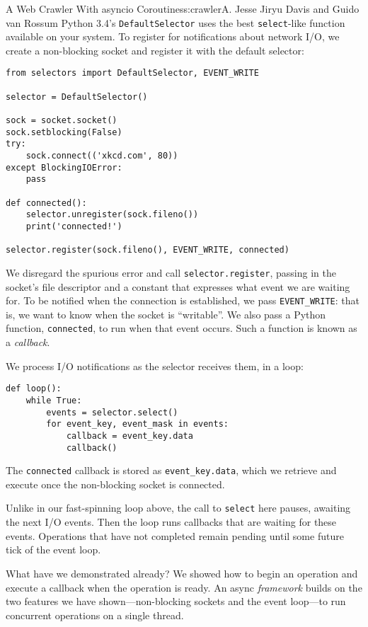 \begin{aosachapter}{A Web Crawler With asyncio Coroutines}{s:crawler}{A. Jesse Jiryu Davis and Guido van Rossum}
Python 3.4's \texttt{DefaultSelector} uses the best \texttt{select}-like
function available on your system. To register for notifications about
network I/O, we create a non-blocking socket and register it with the
default selector:

\begin{verbatim}
from selectors import DefaultSelector, EVENT_WRITE

selector = DefaultSelector()

sock = socket.socket()
sock.setblocking(False)
try:
    sock.connect(('xkcd.com', 80))
except BlockingIOError:
    pass

def connected():
    selector.unregister(sock.fileno())
    print('connected!')

selector.register(sock.fileno(), EVENT_WRITE, connected)
\end{verbatim}

We disregard the spurious error and call \texttt{selector.register},
passing in the socket's file descriptor and a constant that expresses
what event we are waiting for. To be notified when the connection is
established, we pass \texttt{EVENT\_WRITE}: that is, we want to know
when the socket is ``writable''. We also pass a Python function,
\texttt{connected}, to run when that event occurs. Such a function is
known as a \emph{callback}.

We process I/O notifications as the selector receives them, in a loop:

\begin{verbatim}
def loop():
    while True:
        events = selector.select()
        for event_key, event_mask in events:
            callback = event_key.data
            callback()
\end{verbatim}

The \texttt{connected} callback is stored as \texttt{event\_key.data},
which we retrieve and execute once the non-blocking socket is connected.

Unlike in our fast-spinning loop above, the call to \texttt{select} here
pauses, awaiting the next I/O events. Then the loop runs callbacks that
are waiting for these events. Operations that have not completed remain
pending until some future tick of the event loop.

What have we demonstrated already? We showed how to begin an operation
and execute a callback when the operation is ready. An async
\emph{framework} builds on the two features we have shown---non-blocking
sockets and the event loop---to run concurrent operations on a single
thread.


\end{aosachapter}
